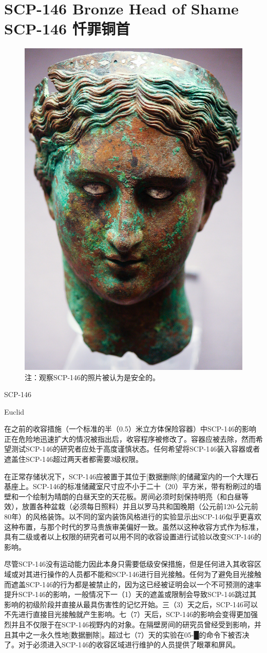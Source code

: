 \chapter[SCP-146 忏罪铜首]{
    SCP-146 Bronze Head of Shame\\
    SCP-146 忏罪铜首
}

\label{chap:SCP-146}

\begin{figure}[H]
    \centering
    \includegraphics[width=0.5\linewidth]{images/SCP-146.jpg}
    \caption*{注：观察SCP-146的照片被认为是安全的。}
\end{figure}

SCP-146

Euclid

在之前的收容措施（一个标准的半（0.5）米立方体保险容器）中SCP-146的影响正在危险地迅速扩大的情况被指出后，收容程序被修改了。容器应被去除，然而希望测试SCP-146的研究者应处于高度谨慎状态。任何希望将SCP-146装入容器或者遮盖住SCP-146超过两天者都需要3级权限。

在正常存储状况下，SCP-146应被置于其位于{[}数据删除]的储藏室内的一个大理石基座上。SCP-146的标准储藏室尺寸应不小于二十（20）平方米，带有粉刷过的墙壁和一个绘制为晴朗的白昼天空的天花板。房间必须时刻保持明亮（和白昼等效），放置各种盆栽（必须每日照料）并且以罗马共和国晚期（公元前120-公元前80年）的风格装饰。以不同的室内装饰风格进行的实验显示出SCP-146似乎更喜欢这种布置，与那个时代的罗马贵族审美偏好一致。虽然以这种收容方式作为标准，具有二级或者以上权限的研究者可以用不同的收容设置进行试验以改变SCP-146的影响。

尽管SCP-146没有运动能力因此本身只需要低级安保措施，但是任何进入其收容区域或对其进行操作的人员都不能和SCP-146进行目光接触。任何为了避免目光接触而遮盖SCP-146的行为都是被禁止的，因为这已经被证明会以一个不可预测的速率提升SCP-146的影响，一般情况下一（1）天的遮盖或限制会导致SCP-146跳过其影响的初级阶段并直接从最具伤害性的记忆开始。三（3）天之后，SCP-146可以不先进行直接目光接触就产生影响。七（7）天后，SCP-146的影响会变得更加强烈并且不仅限于在SCP-146视野内的对象。在隔壁房间的研究员曾经受到影响，并且其中之一永久性地{[}数据删除]。超过七（7）天的实验在05-█的命令下被否决了。对于必须进入SCP-146的收容区域进行维护的人员提供了眼罩和屏风。

